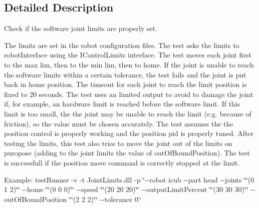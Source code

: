 \subsection{Detailed Description}
Check if the software joint limits are properly set. 

The limits are set in the robot configuration files. The test asks the limits to robot\-Interface using the I\-Control\-Limits interface. The test moves each joint first to the max lim, then to the min lim, then to home. If the joint is unable to reach the software limits within a certain tolerance, the test fails and the joint is put back in home position. The timeout for each joint to reach the limit position is fixed to 20 seconds. The test uses an limited output to avoid to damage the joint if, for example, an hardware limit is reached before the software limit. If this limit is too small, the the joint may be unable to reach the limit (e.\-g. because of friction), so the value must be chosen accurately. The test assumes the the position control is properly working and the position pid is properly tuned. After testing the limits, this test also tries to move the joint out of the limits on puropose (adding to the joint limits the value of out\-Of\-Bound\-Position). The test is successfull if the position move command is correctly stopped at the limit.

Example\-: test\-Runner -\/v -\/t Joint\-Limits.\-dll -\/p \char`\"{}-\/-\/robot icub -\/-\/part head -\/-\/joints \char`\"{}\char`\"{}(0 1 2)\char`\"{}\char`\"{} -\/-\/home \char`\"{}\char`\"{}(0 0 0)\char`\"{}\char`\"{} -\/-\/speed \char`\"{}\char`\"{}(20 20 20)\char`\"{}\char`\"{} -\/-\/output\-Limit\-Percent \char`\"{}\char`\"{}(30 30 30)\char`\"{}\char`\"{} -\/-\/out\-Of\-Bound\-Position \char`\"{}\char`\"{}(2 2 2)\char`\"{}\char`\"{} -\/-\/tolerance 0.\char`\"{}


